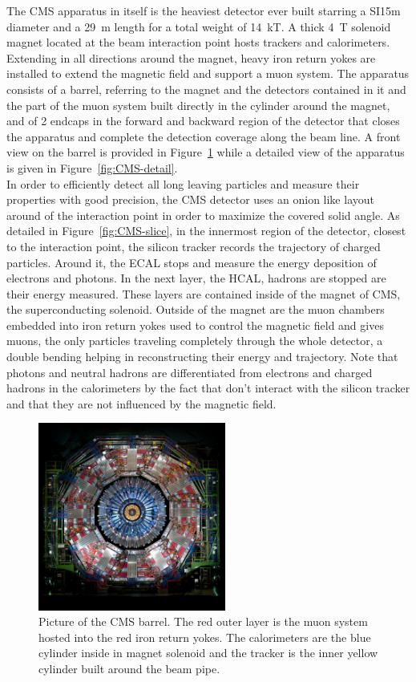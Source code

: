 	The CMS apparatus in itself is the heaviest detector ever built starring a SI{15}{m} diameter and a \SI{29}{m} length for a total weight of \SI{14}{kT}. A thick \SI{4}{T} solenoid magnet located at the beam interaction point hosts trackers and calorimeters. Extending in all directions around the magnet, heavy iron return yokes are installed to extend the magnetic field and support a muon system. The apparatus consists of a barrel, referring to the magnet and the detectors contained in it and the part of the muon system built directly in the cylinder around the magnet, and of 2 endcaps in the forward and backward region of the detector that closes the apparatus and complete the detection coverage along the beam line. A front view on the barrel is provided in Figure~\ref{fig:CMS} while a detailed view of the apparatus is given in Figure~\ref{fig:CMS-detail}.\\
	
	In order to efficiently detect all long leaving particles and measure their properties with good precision, the CMS detector uses an onion like layout around of the interaction point in order to maximize the covered solid angle. As detailed in Figure~\ref{fig:CMS-slice}, in the innermost region of the detector, closest to the interaction point, the silicon tracker records the trajectory of charged particles. Around it, the \acf{ECAL} stops and measure the energy deposition of electrons and photons. In the next layer, the \acf{HCAL}, hadrons are stopped are their energy measured. These layers are contained inside of the magnet of CMS, the superconducting solenoid. Outside of the magnet are the muon chambers embedded into iron return yokes used to control the magnetic field and gives muons, the only particles traveling completely through the whole detector, a double bending helping in reconstructing their energy and trajectory. Note that photons and neutral hadrons are differentiated from electrons and charged hadrons in the calorimeters by the fact  that don't interact with the silicon tracker and that they are not influenced by the magnetic field.
	
	\begin{figure}[H]
		\centering
		\includegraphics[width=0.55\textwidth]{fig/chapt2/CMS.jpg}
		\caption{\label{fig:CMS} Picture of the CMS barrel. The red outer layer is the muon system hosted into the red iron return yokes. The calorimeters are the blue cylinder inside in magnet solenoid and the tracker is the inner yellow cylinder built around the beam pipe.}
	\end{figure}
	
